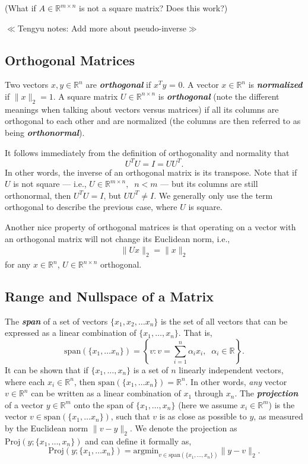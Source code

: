 \documentclass[12pt]{article}
\newcommand{\authnote}[2]{$\ll$\textsf{\footnotesize #1 notes: #2}$\gg$}
\newcommand{\authnote}[2]{}
\newcommand{\Tnote}[1]{{\color{blue}\authnote{Tengyu}{#1}}}
\begin{document}
(What if $A \in \mathbb{R}^{m \times n}$
is not a square matrix?  Does this work?)

\Tnote{Add more about pseudo-inverse}

\subsection{Orthogonal Matrices}
Two vectors $x,y \in \mathbb{R}^n$ are \textbf{\textit{orthogonal}} if
$x^T y$ = 0. A vector $x \in \mathbb{R}^n$ is
\textbf{\textit{normalized}} if $\|x\|_2 = 1$.  A square matrix $U \in
\mathbb{R}^{n \times n}$ is \textbf{\textit{orthogonal}} (note the
different meanings when talking about vectors versus matrices) if all
its columns are orthogonal to each other and are normalized (the
columns are then referred to as being \textbf{\textit{orthonormal}}).

It follows immediately from the definition of orthogonality and
normality that
\[U^TU = I = UU^T.\]
In other words, the inverse of an orthogonal matrix is its transpose.
Note that if $U$ is not square --- i.e., $U \in \mathbb{R}^{m \times
  n},\;\; n < m$ --- but its columns are still orthonormal, then $U^TU
= I$, but $U U^T \neq I$.  We generally only use the term orthogonal
to describe the previous case, where $U$ is square.

Another nice property of orthogonal matrices is that operating on a
vector with an orthogonal matrix will not change its Euclidean norm,
i.e.,
\begin{align}
\|Ux\|_2 = \|x\|_2 \label{eqn:preserve-norm}
\end{align}
for any $x \in \mathbb{R}^n$, $U \in \mathbb{R}^{n \times n}$
orthogonal.

\subsection{Range and Nullspace of a Matrix}
The \textbf{\textit{span}} of a set of vectors $\{x_1, x_2, \ldots
x_n\}$ is the set of all vectors that can be expressed as a linear
combination of $\{x_1, \ldots, x_n\}$.  That is,
\[\mathrm{span}(\{x_1, \ldots x_n\}) = \left \{v : v = \sum_{i=1}^n \alpha_i
x_i, \;\; \alpha_i \in
\mathbb{R} \right \}. \]
It can be shown that if $\{x_1, \ldots, x_n\}$ is a set of $n$
linearly independent vectors, where each $x_i \in \mathbb{R}^n$, then
$\mathrm{span}(\{x_1, \ldots x_n\}) = \mathbb{R}^n$.  In other words,
\textit{any} vector $v \in \mathbb{R}^n$ can be written as a linear
combination of $x_1$ through $x_n$.  The
\textbf{\textit{projection}} of a vector $y \in \mathbb{R}^m$ onto the
span of $\{x_1, \ldots, x_n\}$ (here we assume
$x_i \in \mathbb{R}^m$) is the
vector $v \in \mathrm{span}(\{x_1, \ldots x_n\})$, such that $v$ is as
close as possible to $y$, 
as measured by the Euclidean norm $\|v - y\|_2$.  We denote the
projection as $\mathrm{Proj}(y;\{x_1, \ldots, x_n\})$ and can define
it formally as,
\[\mathrm{Proj}(y;\{x_1, \ldots x_n\}) = \textrm{argmin}_{v \in
  \mathrm{span}(\{x_1, \ldots, x_n\})} \|y - v\|_2.\]  
\end{document}
